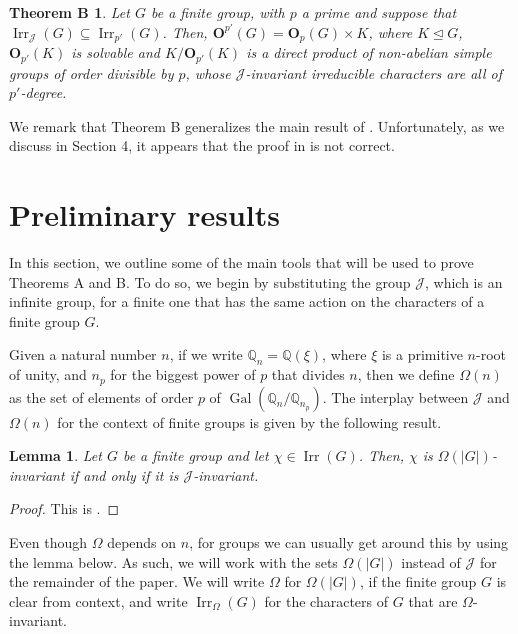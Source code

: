 \documentclass[12pt]{amsart}
\theoremstyle{theorem}
\newtheorem*{thmB}{Theorem B}
\newtheorem{lem}[teo]{Lemma}
\theoremstyle{definition}
\newcommand{\bO}{{\mathbf O}}
\newcommand{\Irr}{{\operatorname{Irr}}}
\begin{document}
	\begin{thmB}
		Let $G$ be a finite group, with $p$ a prime and suppose that $\Irr_{\mathcal{J}}(G) \subseteq \Irr_{p'}(G)$.
		Then, $\bO^{p'}(G) = \bO_p(G) \times K$, where $K \unlhd G$, $\bO_{p'}(K)$ is solvable and $K/\bO_{p'}(K)$ is a direct product of non-abelian simple groups of order divisible by $p$, whose $\mathcal{J}$-invariant irreducible characters are all of $p'$-degree.
	\end{thmB}
	
	We remark that Theorem B  generalizes the main result of \cite{Grit}. Unfortunately, as we discuss in Section 4, it appears that the proof in \cite{Grit} is not correct.
	
	\section{Preliminary results}
	
	In this section, we outline some of the main tools that will be used to prove Theorems A and B. To do so, we begin by substituting the group $\mathcal{J}$, which is an infinite group, for a finite one that has the same action on the characters of a finite group $G$.
	
	Given a natural number $n$, if we write $\mathbb{Q}_n = \mathbb{Q}(\xi)$, where $\xi$ is a primitive $n$-root of unity, and $n_p$ for the biggest power of $p$ that divides $n$, then we define $\Omega(n)$ as the set of elements of order $p$ of $\operatorname{Gal}(\mathbb{Q}_n/\mathbb{Q}_{n_p})$. The interplay between $\mathcal{J}$ and $\Omega(n)$ for the context of finite groups is given by the following result.
	
	\begin{lem}
		Let $G$ be a finite group and let $\chi \in \Irr(G)$. Then, $\chi$ is $\Omega(|G|)$-invariant if and only if it is $\mathcal{J}$-invariant.
	\end{lem}
	
	\begin{proof}
		This is \cite[Lemma 2.1]{MMRSF}.
	\end{proof}
	
	Even though $\Omega$ depends on $n$, for groups we can usually get around this by using the lemma below. As such, we will work with the sets $\Omega(|G|)$ instead of $\mathcal{J}$ for the remainder of the paper. We will write $\Omega$ for $\Omega(|G|)$, if the finite group $G$ is clear from context, and write $\Irr_{\Omega}(G)$ for the characters of $G$ that are $\Omega$-invariant.
	
\end{document}
